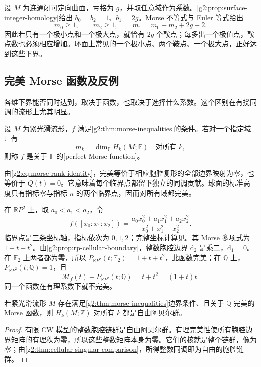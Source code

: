 \begin{example}
	设 \(M\) 为连通闭可定向曲面，亏格为 \(g\)，并取任意域作为系数。\cref{g2:prop:surface-integer-homology}给出 \(b_0=b_2=1\)、\(b_1=2g\)。Morse 不等式与 Euler 等式给出
	\[
		m_0\ge1,\qquad m_2\ge1,\qquad
		m_1=m_0+m_2+2g-2.
	\]
	因此若只有一个极小点和一个极大点，就恰有 \(2g\) 个鞍点；每多出一个极值点，鞍点数也必须相应增加。环面上常见的一个极小点、两个鞍点、一个极大点，正好达到这些下界。
\end{example}

\subsection{完美 Morse 函数及反例}
\label{g2:subsec:1703:04}

各维下界能否同时达到，取决于函数，也取决于选择什么系数。这个区别在有挠同调的流形上尤其明显。

\begin{definition}\label{g2:def:perfect-morse}
	设 \(M\) 为紧光滑流形，\(f\) 满足\cref{g2:thm:morse-inequalities}的条件。若对一个指定域 \(\mathbb F\) 有
	\[
		m_k=\dim_{\mathbb F}H_k(M;\mathbb F)\quad\text{对所有 }k,
	\]
	则称 \(f\) 是关于 \(\mathbb F\) 的[perfect Morse function]。
\end{definition}

由\eqref{g2:eq:morse-rank-identity}，完美等价于相应胞腔复形的全部边界映射为零，也等价于 \(Q(t)=0\)。它意味着每个临界点都留下独立的同调贡献。球面的标准高度只有指标零与指标 \(n\) 的两个临界点，因而对所有域都完美。

\begin{example}\label{g2:exm:projective-perfect-morse}
	在 \(\mathbb RP^2\) 上，取 \(a_0<a_1<a_2\)，令
	\[
		f([x_0:x_1:x_2])=
		\frac{a_0x_0^2+a_1x_1^2+a_2x_2^2}{x_0^2+x_1^2+x_2^2}.
	\]
	临界点是三条坐标轴，指标依次为 \(0,1,2\)；完整坐标计算见。其 Morse 多项式为 \(1+t+t^2\)。由\cref{g2:prop:rp-cellular-boundary}，整数胞腔边界 \(\mathrm d_2\) 是乘二，\(\mathrm d_1=0\)。在 \(\mathbb F_2\) 上两者都为零，所以 \(P_{\mathbb RP^2}(t;\mathbb F_2)=1+t+t^2\)，此函数完美；在 \(\mathbb Q\) 上，\(P_{\mathbb RP^2}(t;\mathbb Q)=1\)，且
	\[
		\mathcal M_f(t)-P_{\mathbb RP^2}(t;\mathbb Q)
		=t+t^2=(1+t)t.
	\]
	同一个函数在有理系数下就不完美。
\end{example}

\begin{proposition}\label{g2:prop:rational-perfect-no-torsion}
	若紧光滑流形 \(M\) 存在满足\cref{g2:thm:morse-inequalities}边界条件、且关于 \(\mathbb Q\) 完美的 Morse 函数，则 \(H_k(M;\mathbb Z)\) 对所有 \(k\) 都是自由阿贝尔群。
\end{proposition}
\begin{proof}
	有限 CW 模型的整数胞腔链群是自由阿贝尔群。有理完美性使所有胞腔边界矩阵的有理秩为零，所以这些整数矩阵本身为零。它们的核就是整个链群，像为零；由\cref{g2:thm:cellular-singular-comparison}，所得整数同调即为自由的胞腔链群。
\end{proof}

